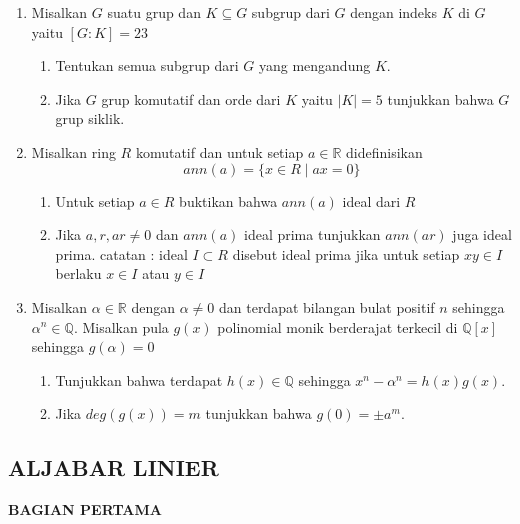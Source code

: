 \documentclass[12pt,twoside]{article}
\begin{document}
\begin{enumerate}

	\item Misalkan $G$ suatu grup dan $K\subseteq G$ subgrup dari $G$ dengan indeks $K$ di $G$ yaitu $[G:K]=23$
	      \begin{enumerate}
		      \item Tentukan semua subgrup dari $G$ yang mengandung $K$.
		      \item Jika $G$ grup komutatif dan orde dari $K$ yaitu $|K|=5$ tunjukkan bahwa $G$ grup siklik.
	      \end{enumerate}

	\item Misalkan ring $R$ komutatif dan untuk setiap $a\in\mathbb{R}$ didefinisikan
	      $$ann(a)=\{x\in R\mid ax=0\}$$
	      \begin{enumerate}
		      \item Untuk setiap $a\in R$ buktikan bahwa $ann(a)$ ideal dari $R$
		      \item Jika $a,r,ar\neq 0$ dan $ann(a)$ ideal prima tunjukkan $ann(ar)$ juga ideal prima.
		            catatan : ideal $I\subset R$ disebut ideal prima jika untuk setiap $xy\in I$ berlaku $x\in I$ atau $y\in I$
	      \end{enumerate}

	\item Misalkan $\alpha \in \mathbb{R}$ dengan $\alpha\neq 0$ dan terdapat bilangan bulat positif $n$ sehingga $\alpha^{n}\in \mathbb{Q}$. Misalkan pula $g(x)$ polinomial monik berderajat terkecil di $\mathbb{Q}[x]$ sehingga $g(\alpha)=0$
	      \begin{enumerate}
		      \item Tunjukkan bahwa terdapat $h(x)\in\mathbb{Q}$ sehingga $x^n-\alpha^n=h(x)g(x)$.
		      \item Jika $deg(g(x))=m$ tunjukkan bahwa $g(0)=\pm a^m$.
	      \end{enumerate}

\end{enumerate}
\newpage
\subsection{ALJABAR LINIER}
\textbf{BAGIAN PERTAMA}
\end{document}
